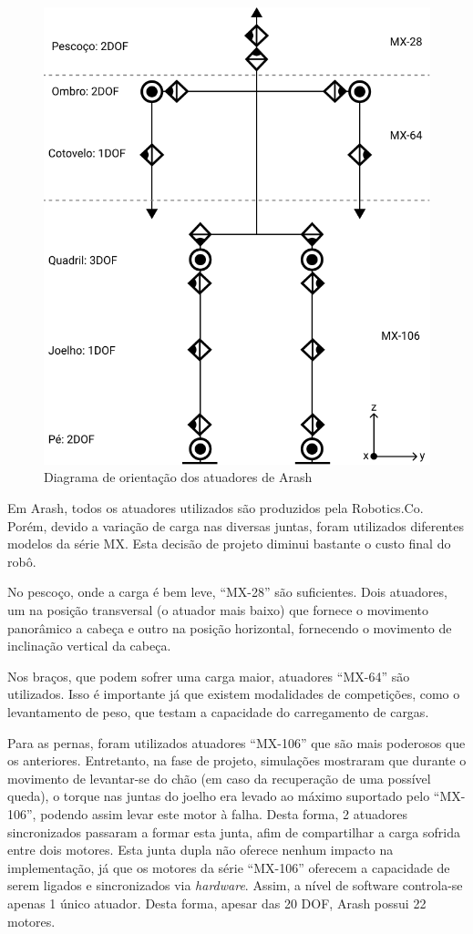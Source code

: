 \begin{figure}[htb]
	\centering
	\includegraphics[scale=1]{imagens/svg/arash-schematics}
	\caption{Diagrama de orientação dos atuadores de Arash}
	\label{fig:architecture:arash:actuators_orientations}
\end{figure}

Em Arash, todos os atuadores utilizados são produzidos pela Robotics.Co. Porém, devido a variação de carga nas diversas juntas, foram utilizados diferentes modelos da série MX. Esta decisão de projeto diminui bastante o custo final do robô.

No pescoço, onde a carga é bem leve, ``MX-28'' são suficientes. Dois atuadores, um na posição transversal (o atuador mais baixo) que fornece o movimento panorâmico a cabeça e outro na posição horizontal, fornecendo o movimento de inclinação vertical da cabeça.

Nos braços, que podem sofrer uma carga maior, atuadores ``MX-64'' são utilizados. Isso é importante já que existem modalidades de competições, como o levantamento de peso, que testam a capacidade do carregamento de cargas.

Para as pernas, foram utilizados atuadores ``MX-106'' que são mais poderosos que os anteriores. Entretanto, na fase de projeto, simulações mostraram que durante o movimento de levantar-se do chão (em caso da recuperação de uma possível queda), o torque nas juntas do joelho era levado ao máximo suportado pelo ``MX-106'', podendo assim levar este motor à falha. Desta forma, 2 atuadores sincronizados passaram a formar esta junta, afim de compartilhar a carga sofrida entre dois motores. Esta junta dupla não oferece nenhum impacto na implementação, já que os motores da série ``MX-106'' oferecem a capacidade de serem ligados e sincronizados via \textit{hardware}. Assim, a nível de software controla-se apenas 1 único atuador. Desta forma, apesar das 20 DOF, Arash possui 22 motores.